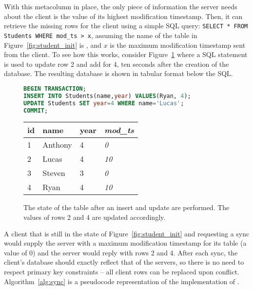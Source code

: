With this metacolumn in place, the only piece of information the server needs about the
client is the value of its highest modification timestamp. Then, it can retrieve
the missing rows for the client using a simple SQL query: \texttt{SELECT * FROM
Students WHERE mod\_ts > x}, assuming the name of the table in
Figure~\ref{fig:student_init} is , and $x$ is the maximum
modification timestamp sent from the client. To see how this works, consider
Figure~\ref{fig:student_update} where a SQL statement is used to update row 2
and add for 4, ten seconds after the creation of the database. The resulting
database is shown in tabular format below the SQL.

\begin{figure}[h!]
\begin{lstlisting}[language=sql]
BEGIN TRANSACTION;
INSERT INTO Students(name,year) VALUES(Ryan, 4);
UPDATE Students SET year=4 WHERE name='Lucas';
COMMIT;
\end{lstlisting}
\center
\begin{tabular}{ l  l  l  l }
id  & name      & year  & \textit{mod\_ts} \\
\hline
1   & Anthony   & 4     & \textit{0}        \\
2   & Lucas     & 4     & \textit{10}        \\
3   & Steven    & 3     & \textit{0}        \\
4   & Ryan      & 4     & \textit{10}        \\
\end{tabular}
\caption{The state of the  table after an insert and update are
performed. The \modts values of rows 2 and 4 are updated accordingly.}
\label{fig:student_update}
\end{figure}

A client that is still in the state of Figure~\ref{fig:student_init} and
requesting a sync would supply the server with a maximum modification
timestamp for its  table (a value of 0) and the server would reply with
rows 2 and 4. After each sync, the client's database should exactly reflect that
of the servers, so there is no need to respect primary key constraints -- all
client rows can be replaced upon conflict. Algorithm~\ref{alg:sync} is a
pseudocode representation of the implementation of \sync.

